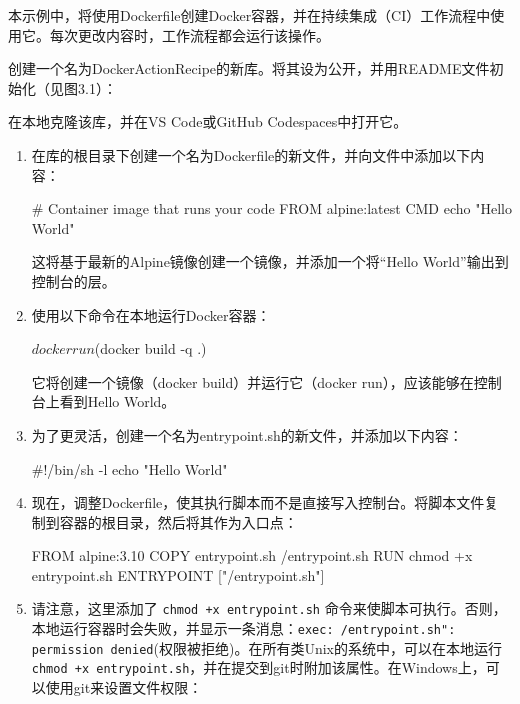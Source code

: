 
本示例中，将使用Dockerfile创建Docker容器，并在持续集成（CI）工作流程中使用它。每次更改内容时，工作流程都会运行该操作。


创建一个名为DockerActionRecipe的新库。将其设为公开，并用README文件初始化（见图3.1）：


在本地克隆该库，并在VS Code或GitHub Codespaces中打开它。


\begin{enumerate}
\item 
在库的根目录下创建一个名为Dockerfile的新文件，并向文件中添加以下内容：

\begin{shell}
# Container image that runs your code
FROM alpine:latest
CMD echo "Hello World"
\end{shell}

这将基于最新的Alpine镜像创建一个镜像，并添加一个将“Hello World”输出到控制台的层。

\item 
使用以下命令在本地运行Docker容器：

\begin{shell}
$ docker run $(docker build -q .)
\end{shell}

它将创建一个镜像（docker build）并运行它（docker run），应该能够在控制台上看到Hello World。

\item 
为了更灵活，创建一个名为entrypoint.sh的新文件，并添加以下内容：

\begin{shell}
#!/bin/sh -l
echo "Hello World"
\end{shell}

\item 
现在，调整Dockerfile，使其执行脚本而不是直接写入控制台。将脚本文件复制到容器的根目录，然后将其作为入口点：

\begin{shell}
FROM alpine:3.10
COPY entrypoint.sh /entrypoint.sh
RUN chmod +x entrypoint.sh
ENTRYPOINT ["/entrypoint.sh"]
\end{shell}

\item 
请注意，这里添加了 \verb|chmod +x entrypoint.sh| 命令来使脚本可执行。否则，本地运行容器时会失败，并显示一条消息：\verb|exec: /entrypoint.sh": permission denied|(权限被拒绝)。在所有类Unix的系统中，可以在本地运行 \verb|chmod +x entrypoint.sh|，并在提交到git时附加该属性。在Windows上，可以使用git来设置文件权限：


\end{enumerate}
